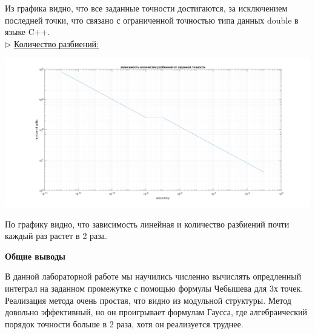 \documentclass{article}
\begin{document}
	Из графика видно, что все заданные точности достигаются, за исключением последней точки, что связано с ограниченной точностью типа данных double в языке C++.\\
	$\triangleright$ \underline{Количество разбиений:}\\
	\begin{center} \includegraphics[scale = 0.4]{Разбиения} \end{center}
	По графику видно, что зависимость линейная и количество разбиений почти каждый раз растет в 2 раза.
	\begin{center} \textbf{Общие выводы}\end{center}
	В данной лабораторной работе мы научились численно вычислять опредленный интеграл на заданном промежутке с помощью формулы Чебышева для 3х точек. Реализация метода очень простая, что видно из модульной структуры. Метод довольно эффективный, но он проигрывает формулам Гаусса, где алгебраический порядок точности больше в 2 раза, хотя он реализуется труднее. 
\end{document}
